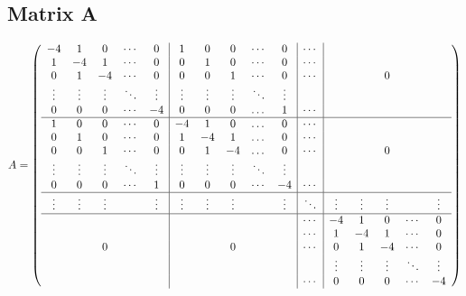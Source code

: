 \subsection{Matrix A}
\begin{frame}

\tiny
\[
	A=\left(
	\begin{array}{ccccc|ccccc|c|ccccc}
	    -4&     1&     0&\cdots&     0 &     1&     0&     0&\cdots&     0 &\cdots &      &      &      &      &      \\
	     1&    -4&     1&\cdots&     0 &     0&     1&     0&\cdots&     0 &\cdots &      &      &      &      &      \\
	     0&     1&    -4&\cdots&     0 &     0&     0&     1&\cdots&     0 &\cdots &      &      &     0&      &      \\
	\vdots&\vdots&\vdots&\ddots&\vdots &\vdots&\vdots&\vdots&\ddots&\vdots &       &      &      &      &      &      \\
	     0&     0&     0&\cdots&    -4 &     0&     0&     0&\dots &     1 &\cdots &      &      &      &      &      \\
	\hline
	     1&     0&     0&\cdots&     0 &    -4&     1&     0&\dots &     0 &\cdots &      &      &      &      &      \\
	     0&     1&     0&\cdots&     0 &     1&    -4&     1&\dots &     0 &\cdots &      &      &      &      &      \\
	     0&     0&     1&\cdots&     0 &     0&     1&    -4&\dots &     0 &\cdots &      &      &     0&      &      \\
	\vdots&\vdots&\vdots&\ddots&\vdots &\vdots&\vdots&\vdots&\ddots&\vdots &       &      &      &      &      &      \\
	     0&     0&     0&\cdots&     1 &     0&     0&     0&\cdots&    -4 &\cdots &      &      &      &      &      \\
	\hline
	\vdots&\vdots&\vdots&      &\vdots &\vdots&\vdots&\vdots&      &\vdots &\ddots &\vdots&\vdots&\vdots&      &\vdots\\
	\hline
	      &      &      &      &       &      &      &      &      &       &\cdots &    -4&     1&     0&\cdots&     0\\
	      &      &      &      &       &      &      &      &      &       &\cdots &     1&    -4&     1&\cdots&     0\\
	      &      &     0&      &       &      &      &     0&      &       &\cdots &     0&     1&    -4&\cdots&     0\\
	      &      &      &      &       &      &      &      &      &       &       &\vdots&\vdots&\vdots&\ddots&\vdots\\
	      &      &      &      &       &      &      &      &      &       &\cdots &     0&     0&     0&\cdots&    -4\\
	\end{array}
	\right) 
	\]

\end{frame}

